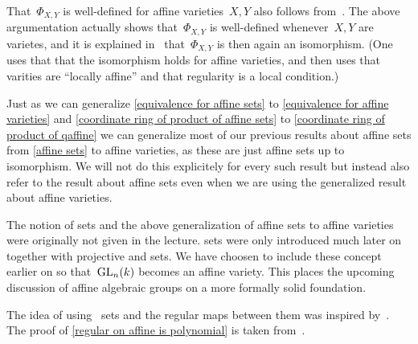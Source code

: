 \begin{remark}
  That~$\Phi_{X,Y}$ is well-defined for affine varieties~$X,Y$ also follows from~.
  The above argumentation actually shows that~$\Phi_{X,Y}$ is well-defined whenever~$X,Y$ are {\qaffine} varietes, and it is explained in~\cite{MO267198} that~$\Phi_{X,Y}$ is then again an isomorphism.
  (One uses that that the isomorphism holds for affine varieties, and then uses that {\qaffine} varities are \enquote{locally affine} and that regularity is a local condition.)
\end{remark}


\begin{remark}
  Just as we can generalize \cref{equivalence for affine sets} to \cref{equivalence for affine varieties} and \cref{coordinate ring of product of affine sets} to \cref{coordinate ring of product of qaffine} we can generalize most of our previous results about affine sets from \cref{affine sets} to affine varieties, as these are just affine sets up to isomorphism.
  We will not do this explicitely for every such result but instead also refer to the result about affine sets even when we are using the generalized result about affine varieties.
\end{remark}


\begin{fluff}
  The notion of {\qaffine} sets and the above generalization of affine sets to affine varieties were originally not given in the lecture.
  {\Qaffine} sets were only introduced much later on together with projective and {\qprojective} sets.
  We have choosen to include these concept earlier on so that~$\operatorname{GL}_n(k)$ becomes an affine variety.
  This places the upcoming discussion of affine algebraic groups on a more formally solid foundation.
  
  The idea of using~{\qaffine} sets and the regular maps between them was inspired by~\cite[2.2]{frankeAlg1}.
  The proof of \cref{regular on affine is polynomial} is taken from~\cite[Lemma~3.10]{milneAG}.
\end{fluff}







